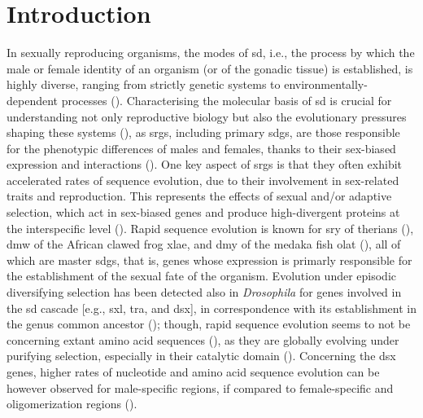 \documentclass[../main.tex]{subfiles}
\begin{document}
\section{Introduction} \label{chapter3_introduction}
In sexually reproducing organisms, the modes of \gls{sd}, i.e., the process by which the male or female identity of an organism (or of the gonadic tissue) is established, is highly diverse, ranging from strictly genetic systems to environmentally-dependent processes (\textbf{\cite{haag2005sex, uller2011origin, bachtrog2014sex, beukeboom2014evolution}}). Characterising the molecular basis of \gls{sd} is crucial for understanding not only reproductive biology but also the evolutionary pressures shaping these systems (\textbf{\cite{wilkins1995moving, ellegren2007evolution, grath2016sex, nicolini2023bivalves}}), as \glspl{srg}, including primary \glspl{sdg}, are those responsible for the phenotypic differences of males and females, thanks to their sex-biased expression and interactions (\textbf{\cite{ellegren2007evolution, beukeboom2014evolution, grath2016sex}}). One key aspect of \glspl{srg} is that they often exhibit accelerated rates of sequence evolution, due to their involvement in sex-related traits and reproduction. This represents the effects of sexual and/or adaptive selection, which act in sex-biased genes and produce high-divergent proteins at the interspecific level (\textbf{\cite{civetta1998sex, ellegren2007evolution, meisel2011towards, grath2016sex}}). Rapid sequence evolution is known for \gls{sry} of therians (\textbf{\cite{pamilo1997evolution, mawaribuchi2012molecular}}), \gls{dmw} of the African clawed frog \gls{xlae}, and \gls{dmy} of the medaka fish \gls{olat} (\textbf{\cite{mawaribuchi2012molecular}}), all of which are master \glspl{sdg}, that is, genes whose expression is primarly responsible for the establishment of the sexual fate of the organism. Evolution under episodic diversifying selection has been detected also in \textit{Drosophila} for genes involved in the \gls{sd} cascade [e.g., \gls{sxl}, \gls{tra}, and \gls{dsx}], in correspondence with its establishment in the genus common ancestor (\textbf{\cite{mullon2012drosophila_sxl, baral2019genetic}}); though, rapid sequence evolution seems to not be concerning extant amino acid sequences (\textbf{\cite{haerty2007evolution, baral2019genetic}}), as they are globally evolving under purifying selection, especially in their catalytic domain (\textbf{\cite{mullon2012drosophila_sxl, baral2019genetic}}). Concerning the \gls{dsx} genes, higher rates of nucleotide and amino acid sequence evolution can be however observed for male-specific regions, if compared to female-specific and oligomerization regions (\textbf{\cite{baral2019genetic}}).
\end{document}
